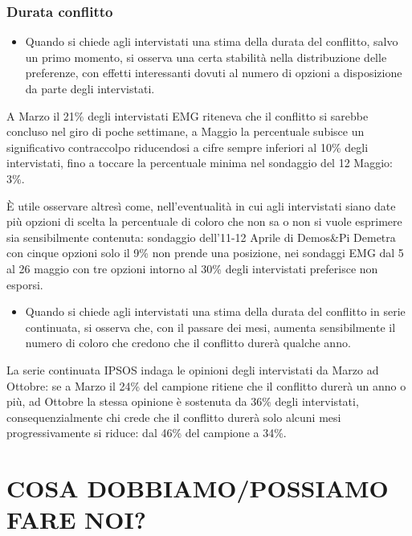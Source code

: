 \documentclass[
]{book}
\providecommand{\tightlist}{%
  \setlength{\itemsep}{0pt}\setlength{\parskip}{0pt}}
\begin{document}
\hypertarget{durata-conflitto}{%
\subsection{Durata conflitto}\label{durata-conflitto}}

\begin{itemize}
\tightlist
\item
  Quando si chiede agli intervistati una stima della durata del conflitto, salvo un primo momento, si osserva una certa stabilità nella distribuzione delle preferenze, con effetti interessanti dovuti al numero di opzioni a disposizione da parte degli intervistati.
\end{itemize}

A Marzo il 21\% degli intervistati EMG riteneva che il conflitto si sarebbe concluso nel giro di poche settimane, a Maggio la percentuale subisce un significativo contraccolpo riducendosi a cifre sempre inferiori al 10\% degli intervistati, fino a toccare la percentuale minima nel sondaggio del 12 Maggio: 3\%.

È utile osservare altresì come, nell'eventualità in cui agli intervistati siano date più opzioni di scelta la percentuale di coloro che non sa o non si vuole esprimere sia sensibilmente contenuta: sondaggio dell'11-12 Aprile di Demos\&Pi Demetra con cinque opzioni solo il 9\% non prende una posizione, nei sondaggi EMG dal 5 al 26 maggio con tre opzioni intorno al 30\% degli intervistati preferisce non esporsi.

\begin{itemize}
\tightlist
\item
  Quando si chiede agli intervistati una stima della durata del conflitto in serie continuata, si osserva che, con il passare dei mesi, aumenta sensibilmente il numero di coloro che credono che il conflitto durerà qualche anno.
\end{itemize}

La serie continuata IPSOS indaga le opinioni degli intervistati da Marzo ad Ottobre: se a Marzo il 24\% del campione ritiene che il conflitto durerà un anno o più, ad Ottobre la stessa opinione è sostenuta da 36\% degli intervistati, consequenzialmente chi crede che il conflitto durerà solo alcuni mesi progressivamente si riduce: dal 46\% del campione a 34\%.

\hypertarget{cosa-dobbiamopossiamo-fare-noi}{%
\chapter{COSA DOBBIAMO/POSSIAMO FARE NOI?}\label{cosa-dobbiamopossiamo-fare-noi}}
\end{document}
